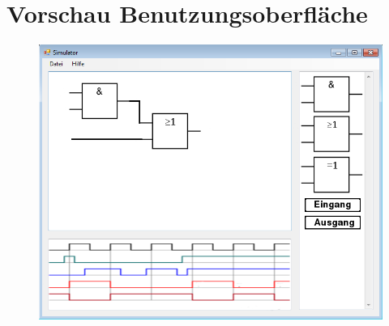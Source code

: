 
\section{Vorschau Benutzungsoberfläche}

\begin{figure}[!h]
	\centering
	\includegraphics[width=1\textwidth]{gui.png}
\end{figure}
